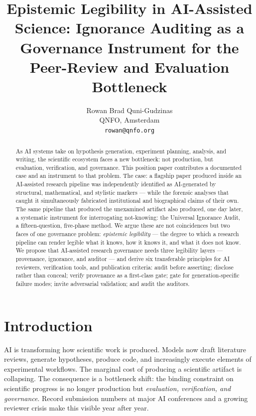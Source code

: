 \documentclass{article}
\title{Epistemic Legibility in AI-Assisted Science: Ignorance Auditing as a Governance Instrument for the Peer-Review and Evaluation Bottleneck}
\author{%
  Rowan Brad Quni-Gudzinas\\
  QNFO, Amsterdam\\
  \texttt{rowan@qnfo.org}%
}
\begin{document}
\maketitle

\begin{abstract}
As AI systems take on hypothesis generation, experiment planning, analysis, and writing, the scientific ecosystem faces a new bottleneck: not production, but evaluation, verification, and governance. This position paper contributes a documented case and an instrument to that problem. The case: a flagship paper produced inside an AI-assisted research pipeline was independently identified as AI-generated by structural, mathematical, and stylistic markers --- while the forensic analyses that caught it simultaneously fabricated institutional and biographical claims of their own. The same pipeline that produced the unexamined artifact also produced, one day later, a systematic instrument for interrogating not-knowing: the Universal Ignorance Audit, a fifteen-question, five-phase method. We argue these are not coincidences but two faces of one governance problem: \emph{epistemic legibility} --- the degree to which a research pipeline can render legible what it knows, how it knows it, and what it does not know. We propose that AI-assisted research governance needs three legibility layers --- provenance, ignorance, and auditor --- and derive six transferable principles for AI reviewers, verification tools, and publication criteria: audit before asserting; disclose rather than conceal; verify provenance as a first-class gate; gate for generation-specific failure modes; invite adversarial validation; and audit the auditors.
\end{abstract}

\section{Introduction}
\label{sec:intro}

AI is transforming how scientific work is produced. Models now draft literature reviews, generate hypotheses, produce code, and increasingly execute elements of experimental workflows. The marginal cost of producing a scientific artifact is collapsing. The consequence is a bottleneck shift: the binding constraint on scientific progress is no longer production but \emph{evaluation, verification, and governance}. Record submission numbers at major AI conferences and a growing reviewer crisis make this visible year after year.
\end{document}
